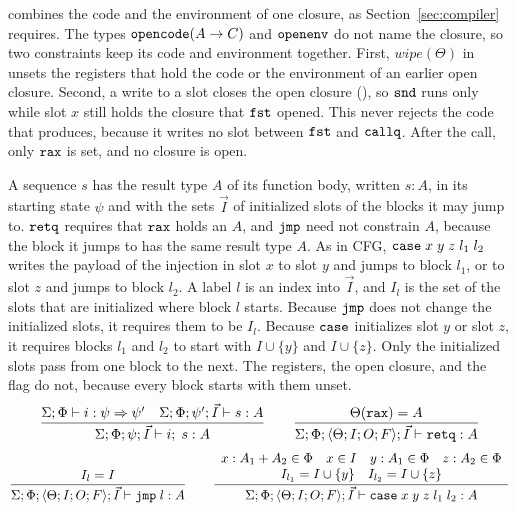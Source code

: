 combines the code and the environment of one closure, as
Section~\ref{sec:compiler} requires. The types
$\mathtt{opencode}(A \rightarrow C)$ and $\mathtt{openenv}$ do not name the closure, so
two constraints keep its code and environment together. First,
$\mathit{wipe}(\Theta)$ in  unsets the registers that hold
the code or the environment of an earlier open closure. Second, a write to a
slot closes the open closure (), so $\mathtt{snd}$ runs only
while slot $x$ still holds the closure that $\mathtt{fst}$ opened. This never
rejects the code that  produces, because it writes no
slot between $\mathtt{fst}$ and $\mathtt{callq}$. After the call, only $\mathtt{rax}$ is
set, and no closure is open.

A sequence $s$ has the result type $A$ of its function body, written $s : A$,
in its starting state $\psi$ and with the sets $\vec{I}$ of initialized slots
of the blocks it may jump to. $\mathtt{retq}$ requires that $\mathtt{rax}$ holds an
$A$, and $\mathtt{jmp}$ need not constrain $A$, because the block it jumps to has
the same result type $A$. As in CFG, $\mathtt{case}\;x\;y\;z\;l_1\;l_2$ writes the
payload of the injection in slot $x$ to slot $y$ and jumps to block $l_1$, or
to slot $z$ and jumps to block $l_2$. A label $l$ is an index into $\vec{I}$,
and $I_l$ is the set of the slots that are initialized where block $l$ starts.
Because $\mathtt{jmp}$ does not change the initialized slots, it requires them to be
$I_l$. Because $\mathtt{case}$ initializes slot $y$ or slot $z$, it requires blocks
$l_1$ and $l_2$ to start with $I \cup \{y\}$ and $I \cup \{z\}$. Only the
initialized slots pass from one block to the next. The registers, the open
closure, and the flag do not, because every block starts with them unset.
{\small\figdefs
{}
\[
  \dfrac{\Sigma; \Phi \vdash i : \psi \Rightarrow \psi' \quad \Sigma; \Phi; \psi'; \vec{I} \vdash s : A}
        {\Sigma; \Phi; \psi; \vec{I} \vdash i;\; s : A}
  \qquad
  \dfrac{\Theta(\mathtt{rax}) = A}{\Sigma; \Phi; \langle \Theta; I; O; F \rangle; \vec{I} \vdash \mathtt{retq} : A}
\]
\[
  \dfrac{I_l = I}{\Sigma; \Phi; \langle \Theta; I; O; F \rangle; \vec{I} \vdash \mathtt{jmp}\;l : A}
  \qquad
  \dfrac{\begin{array}{c}
           x : A_1 + A_2 \in \Phi \quad x \in I \quad y : A_1 \in \Phi \quad z : A_2 \in \Phi\\
           I_{l_1} = I \cup \{y\} \quad I_{l_2} = I \cup \{z\}
         \end{array}}
        {\Sigma; \Phi; \langle \Theta; I; O; F \rangle; \vec{I} \vdash \mathtt{case}\;x\;y\;z\;l_1\;l_2 : A}
\]
}
